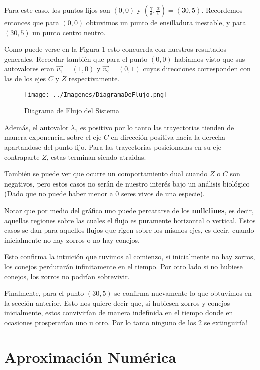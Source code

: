 \documentclass[10pt,journal,compsoc]{IEEEtran}
\begin{document}
 Para este caso, los puntos fijos son $(0, 0)$ y $(\frac{\gamma}{\delta},
 \frac{\alpha}{\beta}) = (30, 5)$. Recordemos entonces que para
 $(0,0)$ obtuvimos un punto de ensilladura inestable, y para $(30, 5)$ un punto centro
 neutro.

 Como puede verse en la Figura 1 esto concuerda con nuestros resultados
 generales. Recordar también que para el punto $(0, 0)$ habiamos visto que sus autovalores
 eran $\vec{v_1} = (1, 0)$ y $\vec{v_2} = (0, 1)$ cuyas direcciones corresponden
 con las de los ejes $C$ y $Z$ respectivamente.
 
 \begin{figure}[!t]
  \centering
  \texttt{[image: ../Imagenes/DiagramaDeFlujo.png]}
  \caption{Diagrama de Flujo del Sistema}
  \label{fig_sim}
 \end{figure}

 Además, el autovalor $\lambda_1$ es positivo por lo tanto las trayectorias
 tienden de manera exponencial sobre el eje $C$ en dirección positiva hacia la
 derecha apartandose del punto fijo. Para las trayectorias posicionadas en su
 eje contraparte $Z$, estas terminan siendo atraidas.

 También se puede ver que ocurre un comportamiento dual cuando $Z$ o $C$ son
 negativos, pero estos casos no serán de nuestro interés bajo un análisis
 biológico (Dado que no puede haber menor a 0 seres vivos de una especie).

 Notar que por medio del gráfico uno puede percatarse de los
 \textbf{nullclines}, es decir, aquellas regiones sobre las cuales el flujo es
 puramente horizontal o vertical. Estos casos se dan para aquellos flujos que
 rigen sobre los mismos ejes, es decir, cuando inicialmente no hay zorros o no
 hay conejos.

 Esto confirma la intuición que tuvimos al comienzo, si inicialmente no hay
 zorros, los conejos perdurarán infinitamente en el tiempo. Por otro lado si no
 hubiese conejos, los zorros no podrían sobrevivir.

 Finalmente, para el punto $(30, 5)$ se confirma nuevamente lo que obtuvimos en
 la sección anterior. Esto nos quiere decir que, si hubiesen zorros y conejos
 inicialmente, estos convivirían de manera indefinida en el tiempo donde en
 ocasiones prosperarían uno u otro. Por lo tanto ninguno de los 2 se
 extinguiría!

 \section{Aproximación Numérica}
\end{document}
